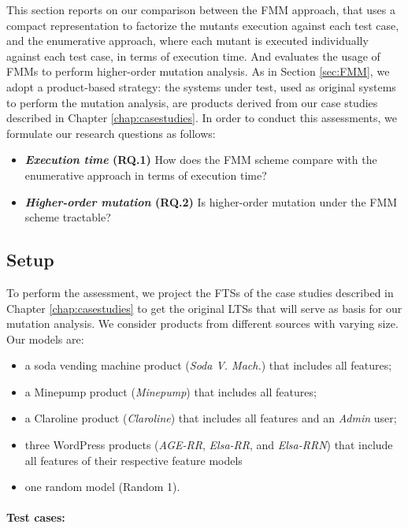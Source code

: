 This section reports on our comparison \cite{Devroey2016a} between the \gls{FMM} approach, that uses a compact representation to factorize the mutants execution against each test case, and the enumerative approach, where each mutant is executed individually against each test case, in terms of execution time. And evaluates the usage of \glspl{FMM} to perform higher-order mutation analysis.
As in Section \ref{sec:FMM}, we adopt a product-based strategy: the systems under test, used as original systems to perform the mutation analysis, are products derived from our case studies described in Chapter \ref{chap:casestudies}. In order to conduct this assessments, we formulate our research questions as follows:
\begin{itemize}
\item \textbf{\textit{Execution time} (RQ.1) } How does the FMM scheme compare with the enumerative approach in terms of execution time?
\item \textbf{\textit{Higher-order mutation} (RQ.2) } Is higher-order mutation under the FMM scheme tractable?
\end{itemize}

\subsection{Setup}

To perform the assessment, we project the FTSs of the case studies described in Chapter \ref{chap:casestudies} to get the original LTSs that will serve as basis for our mutation analysis. We consider products from different sources with varying size. Our models are: 
\begin{itemize}
\item a soda vending machine product (\textit{Soda V. Mach.}) that includes all features;
\item a Minepump product (\textit{Mine\-pump}) that includes all features;
\item a Claroline product (\textit{Claroline}) that includes all features and an \textit{Admin} user;
\item three WordPress products (\textit{AGE-RR}, \textit{Elsa-RR}, and \textit{Elsa-RRN}) that include all features of their respective feature models
\item one random model (Random 1).
\end{itemize}

\paragraph{Test cases:} 

